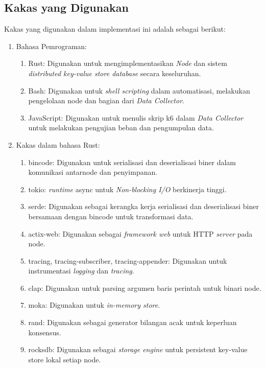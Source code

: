 \subsection{Kakas yang Digunakan}
\label{subsection:kakas-yang-digunakan}

Kakas yang digunakan dalam implementasi ini adalah sebagai berikut:
\begin{enumerate}
	\item Bahasa Pemrograman:
	      \begin{enumerate}
		      \item Rust: Digunakan untuk mengimplementasikan \textit{Node} dan sistem \textit{distributed key-value store database} secara keseluruhan.
		      \item Bash: Digunakan untuk \textit{shell scripting} dalam automatisasi, melakukan pengelolaan node dan bagian dari \textit{Data Collector}.
		      \item JavaScript: Digunakan untuk menulis skrip k6 dalam \textit{Data Collector} untuk melakukan pengujian beban dan pengumpulan data.
	      \end{enumerate}
	\item Kakas dalam bahasa Rust:
	      \begin{enumerate}
		      \item bincode: Digunakan untuk serialisasi dan deserialisasi biner dalam komunikasi antarnode dan penyimpanan.
		      \item tokio: \textit{runtime} async untuk \textit{Non-blocking I/O} berkinerja tinggi.
		      \item serde: Digunakan sebagai kerangka kerja serialisasi dan deserialisasi biner bersamaan dengan bincode untuk transformasi data.
		      \item actix-web: Digunakan sebagai \textit{framework web} untuk HTTP \textit{server} pada node.
		      \item tracing, tracing-subscriber, tracing-appender: Digunakan untuk instrumentasi \textit{logging} dan \textit{tracing}.
		      \item clap: Digunakan untuk parsing argumen baris perintah untuk binari node.
		      \item moka: Digunakan untuk \textit{in-memory store}.
		      \item rand: Digunakan sebagai generator bilangan acak untuk keperluan konsensus.
		      \item rocksdb: Digunakan sebagai \textit{storage engine} untuk persistent key-value store lokal setiap node.
	      \end{enumerate}

\end{enumerate}
